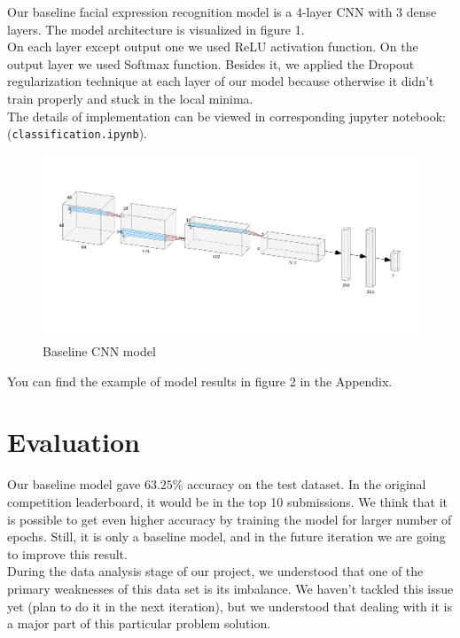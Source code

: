 Our baseline facial expression recognition model is a 4-layer CNN with 3 dense layers. The model architecture is visualized in figure 1.\\

On each layer except output one we used ReLU activation function. On the output layer we used Softmax function. Besides it, we applied the Dropout regularization technique at each layer of our model because otherwise it didn't train properly and stuck in the local minima. \\

The details of implementation can be viewed in corresponding jupyter notebook: (\texttt{classification.ipynb}).\\

\begin{figure}
	\centering
	\includegraphics[width=\textwidth]{../images/baseline-architecture.png}
	\caption{Baseline CNN model}
\end{figure}

You can find the example of model results in figure 2 in the Appendix.

\section{Evaluation}

Our baseline model gave $63.25\%$ accuracy on the test dataset. In the original competition leaderboard, it would be in the top 10 submissions. We think that it is possible to get even higher accuracy by training the model for larger number of epochs. Still, it is only a baseline model, and in the future iteration we are going to improve this result.\\ 

During the data analysis stage of our project, we understood that one of the primary weaknesses of this data set is its imbalance. We haven't tackled this issue yet (plan to do it in the next iteration), but we understood that dealing with it is a major part of this particular problem solution.\\

